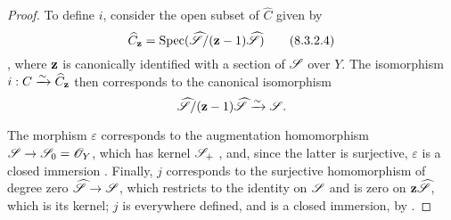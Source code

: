 \begin{proof}
\label{proof-2.8.3.2}
To define $i$, consider the open subset of $\widehat{C}$ given by
\[
\label{eq:2.8.3.2.4}
  \widehat{C}_{\mathbf{z}} = \operatorname{Spec}(\widehat{\mathscr{S}}/(\mathbf{z}-1)\widehat{\mathscr{S}})
\tag{8.3.2.4}
\]
, where $\mathbf{z}$ is canonically identified with a section of $\mathscr{S}$ over $Y$.
The isomorphism $i: C\xrightarrow{\sim}\widehat{C}_{\mathbf{z}}$ then corresponds to the canonical isomorphism 
\[
  \widehat{\mathscr{S}}/(\mathbf{z}-1)\widehat{\mathscr{S}} \xrightarrow{\sim} \mathscr{S}.
\]

The morphism $\varepsilon$ corresponds to the augmentation homomorphism $\sh{S}\to\sh{S}_0=\sh{O}_Y$, which has kernel $\mathscr{S}_+$ , and, since the latter is surjective, $\varepsilon$ is a closed immersion .
Finally, $j$ corresponds  to the surjective homomorphism of degree zero $\widehat{\sh{S}}\to\sh{S}$, which restricts to the identity on $\mathscr{S}$ and is zero on $\mathbf{z}\widehat{\mathscr{S}}$, which is its kernel;
$j$ is everywhere defined, and is a closed immersion, by .


\end{proof}
